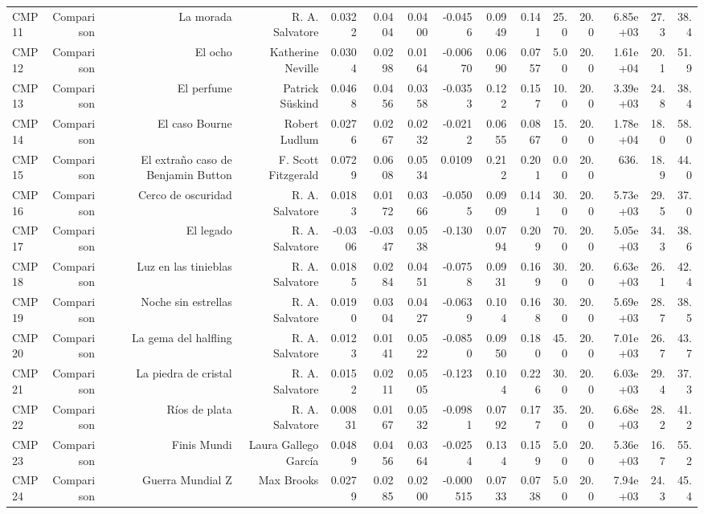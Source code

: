 \begin{table}[htbp]
\begin{tabular}{lrrrrrrrrrrrrrr}
CMP11 & Comparison & La morada & R. A. Salvatore & 0.0322 & 0.0404 & 0.0400 & -0.0456 & 0.0949 & 0.141 & 25.0 & 20.0 & 6.85e+03 & 27.3 & 38.4 \\
CMP12 & Comparison & El ocho & Katherine Neville & 0.0304 & 0.0298 & 0.0164 & -0.00670 & 0.0690 & 0.0757 & 5.00 & 20.0 & 1.61e+04 & 20.1 & 51.9 \\
CMP13 & Comparison & El perfume & Patrick Süskind & 0.0468 & 0.0456 & 0.0358 & -0.0353 & 0.122 & 0.157 & 10.0 & 20.0 & 3.39e+03 & 24.8 & 38.4 \\
CMP14 & Comparison & El caso Bourne & Robert Ludlum & 0.0276 & 0.0267 & 0.0232 & -0.0212 & 0.0655 & 0.0867 & 15.0 & 20.0 & 1.78e+04 & 18.0 & 58.0 \\
CMP15 & Comparison & El extraño caso de Benjamin Button & F. Scott Fitzgerald & 0.0729 & 0.0608 & 0.0534 & 0.0109 & 0.212 & 0.201 & 0.00 & 20.0 & 636. & 18.9 & 44.0 \\
CMP16 & Comparison & Cerco de oscuridad & R. A. Salvatore & 0.0183 & 0.0172 & 0.0366 & -0.0505 & 0.0909 & 0.141 & 30.0 & 20.0 & 5.73e+03 & 29.5 & 37.0 \\
CMP17 & Comparison & El legado & R. A. Salvatore & -0.0306 & -0.0347 & 0.0538 & -0.130 & 0.0794 & 0.209 & 70.0 & 20.0 & 5.05e+03 & 34.3 & 38.6 \\
CMP18 & Comparison & Luz en las tinieblas & R. A. Salvatore & 0.0185 & 0.0284 & 0.0451 & -0.0758 & 0.0931 & 0.169 & 30.0 & 20.0 & 6.63e+03 & 26.1 & 42.4 \\
CMP19 & Comparison & Noche sin estrellas & R. A. Salvatore & 0.0190 & 0.0304 & 0.0427 & -0.0639 & 0.104 & 0.168 & 30.0 & 20.0 & 5.69e+03 & 28.7 & 38.5 \\
CMP20 & Comparison & La gema del halfling & R. A. Salvatore & 0.0123 & 0.0141 & 0.0522 & -0.0850 & 0.0950 & 0.180 & 45.0 & 20.0 & 7.01e+03 & 26.7 & 43.7 \\
CMP21 & Comparison & La piedra de cristal & R. A. Salvatore & 0.0152 & 0.0211 & 0.0505 & -0.123 & 0.104 & 0.226 & 30.0 & 20.0 & 6.03e+03 & 29.4 & 37.3 \\
CMP22 & Comparison & Ríos de plata & R. A. Salvatore & 0.00831 & 0.0167 & 0.0532 & -0.0981 & 0.0792 & 0.177 & 35.0 & 20.0 & 6.68e+03 & 28.2 & 41.2 \\
CMP23 & Comparison & Finis Mundi & Laura Gallego García & 0.0489 & 0.0456 & 0.0364 & -0.0254 & 0.134 & 0.159 & 5.00 & 20.0 & 5.36e+03 & 16.7 & 55.2 \\
CMP24 & Comparison & Guerra Mundial Z & Max Brooks & 0.0279 & 0.0285 & 0.0200 & -0.000515 & 0.0733 & 0.0738 & 5.00 & 20.0 & 7.94e+03 & 24.3 & 45.4 \\

\end{tabular}
\end{table}
